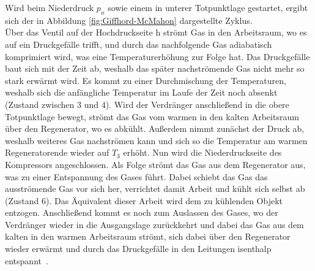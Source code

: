 \documentclass[parskip=half, a4paper,twoside,final]{article}
\begin{document}
Wird beim Niederdruck $p_n$ sowie einem in unterer Totpunktlage gestartet, ergibt sich der in Abbildung \ref{fig:Giffhord-McMahon} dargestellte Zyklus. \\
Über das Ventil auf der Hochdruckseite h strömt Gas in den Arbeitsraum, wo es auf ein Druckgefälle trifft, und durch das nachfolgende Gas adiabatisch komprimiert wird, was eine Temperaturerhöhung zur Folge hat. Das Druckgefälle baut sich mit der Zeit ab, weshalb das später nachströmende Gas nicht mehr so stark erwärmt wird. Es kommt zu einer Durchmischung der Temperaturen, weshalb sich die anfängliche Temperatur im Laufe der Zeit noch absenkt (Zustand zwischen 3 und 4). Wird der Verdränger anschließend in die obere Totpunktlage bewegt, strömt das Gas vom warmen in den kalten Arbeitsraum  über den Regenerator, wo es abkühlt. Außerdem nimmt zunächst der Druck ab, weshalb weiteres Gas nachströmen kann und sich so die Temperatur am warmen Regeneratorende wieder auf $T_3$ erhöht. Nun wird die Niederdruckseite des Kompressors angeschlossen. Als Folge strömt das Gas aus dem Regenerator aus, was zu einer Entspannung des Gases führt. Dabei schiebt das Gas das ausströmende Gas vor sich her, verrichtet damit Arbeit und kühlt sich selbst ab (Zustand 6). Das Äquivalent dieser Arbeit wird dem zu kühlenden Objekt entzogen. Anschließend kommt es noch zum Auslassen des Gases, wo der Verdränger wieder in die Ausgangslage zurückkehrt und dabei das Gas aus dem kalten in den warmen Arbeitsraum strömt, sich dabei über den Regenerator wieder erwärmt und durch das Druckgefälle in den Leitungen isenthalp entspannt~\cite{Frey}.
\end{document}
